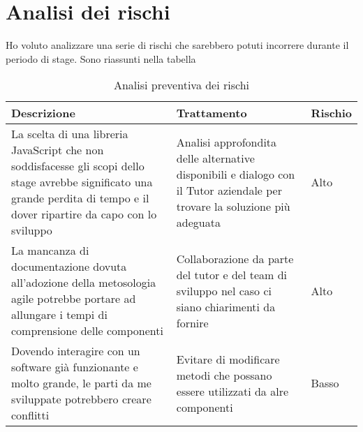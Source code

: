 \newpage
\section {Analisi dei rischi}
Ho voluto analizzare una serie di rischi che sarebbero potuti incorrere durante il periodo di stage. Sono riassunti nella tabella\\ %

\begin{table}[h] %
	\centering
	\caption{Analisi preventiva dei rischi}
	\label{tab:analisi-dei-rischi}
	\begin{tabular}{|p{6cm}|p{}|p{}|}
		\hline
		\rule[-4mm]{0mm}{1cm}
		\textbf{Descrizione} & \textbf{Trattamento} & \textbf{Rischio}\\
		\hline
		La scelta di una libreria JavaScript che non soddisfacesse gli scopi dello stage avrebbe significato una grande perdita di tempo e il dover ripartire da capo con lo sviluppo & Analisi approfondita delle alternative disponibili e dialogo con il Tutor aziendale per trovare la soluzione più adeguata & Alto\\
		\hline
		La mancanza di documentazione dovuta all'adozione della metosologia agile potrebbe portare ad allungare i tempi di comprensione delle componenti & Collaborazione da parte del tutor e del team di sviluppo nel caso ci siano chiarimenti da fornire & Alto\\
		\hline
		Dovendo interagire con un software già funzionante e molto grande, le parti da me sviluppate potrebbero creare conflitti & Evitare di modificare metodi che possano essere utilizzati da alre componenti & Basso\\
		\hline
		
	\end{tabular}
\end{table}
\newpage
\cleardoublepage
